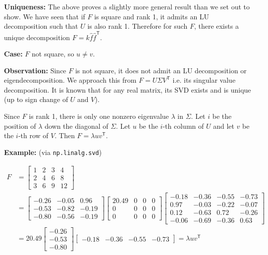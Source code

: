 \documentclass{article}
\begin{document}
\begin{enumerate}[label=(\roman*)]
\textbf{Uniqueness:} The above proves a slightly more general result than we set out to show. We have seen that if $F$ is square and rank 1, it admits an LU decomposition such that $U$ is also rank 1. Therefore for such $F$, there exists a unique decomposition $F=k\hat{f}\hat{f}^\mathsf{T}$.

\textbf{Case:} $F$ not square, so $u \neq v$.

\textbf{Observation:} Since $F$ is not square, it does not admit an LU decomposition or eigendecomposition. We approach this from $F=U\Sigma V^\mathsf{T}$ i.e. its singular value decomposition. It is known that for any real matrix, its SVD exists and is unique (up to sign change of $U$ and $V$).

Since $F$ is rank 1, there is only one nonzero eigenvalue $\lambda$ in $\Sigma$. Let $i$ be the position of $\lambda$ down the diagonal of $\Sigma$. Let $u$ be the $i$-th column of $U$ and let $v$ be the $i$-th row of $V$. Then $F=\lambda u v^\mathsf{T}$.

\textbf{Example:} (via \texttt{np.linalg.svd})

\begin{equation}
\begin{aligned}
F &= 
\begin{bmatrix}
1 & 2 & 3 & 4 \\
2 & 4 & 6 & 8 \\
3 & 6 & 9 & 12
\end{bmatrix} \\
&=
\begin{bmatrix}
-0.26 & -0.05 & 0.96 \\
-0.53 & -0.82 & -0.19 \\
-0.80 & -0.56 & -0.19
\end{bmatrix}
\begin{bmatrix}
20.49 & 0 & 0 & 0 \\
0 & 0 & 0 & 0 \\
0 & 0 & 0 & 0
\end{bmatrix}
\begin{bmatrix}
-0.18 & -0.36 & -0.55 & -0.73 \\
0.97 & -0.03 & -0.22 & -0.07 \\
0.12 & -0.63 & 0.72 & -0.26 \\
-0.06 & -0.69 & -0.36 & 0.63
\end{bmatrix} \\
&=
20.49
\begin{bmatrix}
-0.26 \\
-0.53 \\
-0.80
\end{bmatrix}
\begin{bmatrix}
-0.18 & -0.36 & -0.55 & -0.73
\end{bmatrix}
= \lambda u v^\mathsf{T}
\end{aligned}
\end{equation}


\end{enumerate}
\end{document}
